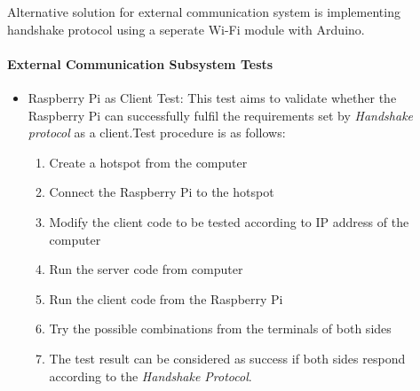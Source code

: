 \documentclass[a4paper,12pt]{article}
\begin{document}
	Alternative solution for external communication system is implementing handshake protocol using a seperate Wi-Fi module with Arduino.
	\paragraph{External Communication Subsystem Tests}
		
		\begin{itemize}
		
		\item Raspberry Pi as Client Test:
			This test aims to validate whether the Raspberry Pi can successfully fulfil the requirements set by \textit{Handshake protocol} as a client.Test procedure is as follows:
			\begin{enumerate}
				\item Create a hotspot from the computer \vspace{-0.2cm}
				\item Connect the Raspberry Pi to the hotspot \vspace{-0.2cm}
				\item Modify the client code to be tested according to IP address of the computer
				\item Run the server code from computer \vspace{-0.2cm}
				\item Run the client code from the Raspberry Pi \vspace{-0.2cm}
				\item Try the possible combinations from the terminals of both sides \vspace{-0.2cm}
				\item The test result can be considered as success if both sides respond according to the \textit{Handshake Protocol}.
			\end{enumerate}		
		

\end{itemize}
\end{document}
